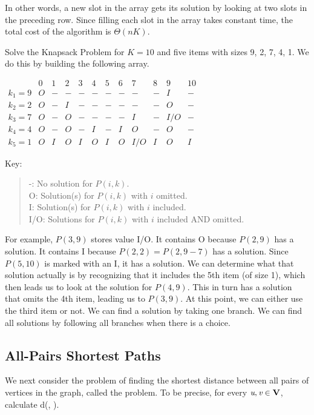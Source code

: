 \noindent
In other words, a new slot in the array gets its solution by looking
at two slots in the preceding row.
Since filling each slot in the array takes constant time, the total
cost of the algorithm is $\Theta(nK)$.

\begin{example}
Solve the Knapsack Problem for $K = 10$ and five items with sizes
9, 2, 7, 4, 1. 
We do this by building the following array.

$\begin{array}{l|ccccccccccc}
&0&1&2&3&4&5&6&7&8&9&10\\
\hline
k_1\!=\!9&O&-&-&-&-&-&-&-&-&I&-\\
k_2\!=\!2&O&-&I&-&-&-&-&-&-&O&-\\
k_3\!=\!7&O&-&O&-&-&-&-&I&-&I/O&-\\
k_4\!=\!4&O&-&O&-&I&-&I&O&-&O&-\\
k_5\!=\!1&O&I&O&I&O&I&O&I/O&I&O&I
\end{array}$

\bigskip
Key:
\begin{verse}
-:  No solution for $P(i, k)$.\\
O: Solution(s) for $P(i, k)$ with $i$ omitted.\\
I: Solution(s) for $P(i, k)$ with $i$ included.\\
I/O: Solutions for $P(i, k)$ with $i$ included AND omitted.
\end{verse}

\bigskip
For example, $P(3, 9)$ stores value I/O.
It contains O because $P(2, 9)$ has a solution.
It contains I because $P(2,2) = P(2, 9-7)$ has a solution.
Since $P(5, 10)$ is marked with an I, it has a solution.
We can determine what that solution actually is by recognizing that
it includes the 5th item (of size 1), which then leads us to look at
the solution for $P(4, 9)$. This in turn has a solution that omits the
4th item, leading us to $P(3, 9)$.
At this point, we can either use the third item or not.
We can find a solution by taking one branch.
We can find all solutions by following all branches when there is a
choice.
\end{example}

\subsection{All-Pairs Shortest Paths}
\label{FloydSec}

We next consider the problem of finding the shortest distance
between all pairs of vertices in the graph, called
the  problem.
To be precise, for every ${\textit{u}}, {\textit{v}} \in {\textbf{V}}$,
calculate d(, ). 

